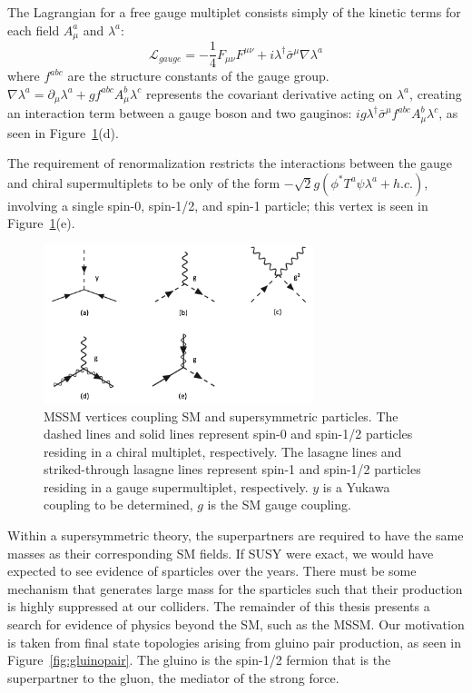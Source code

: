 The Lagrangian for a free gauge multiplet consists simply of the kinetic terms for each field $A_{\mu}^{a}$ and $\lambda^{a}$:
\begin{equation}
\mathcal{L}_{gauge} = -\frac{1}{4}F_{\mu\nu}F^{\mu\nu} + i \lambda^{\dagger}\bar{\sigma}^{\mu}\nabla\lambda^{a}
\end{equation}
where $f^{abc}$ are the structure constants of the gauge group. $\nabla\lambda^{a} = \partial_{\mu}\lambda^{a}+gf^{abc}A^{b}_{\mu}\lambda^{c}$ represents the covariant derivative acting on $\lambda^{a}$, creating an interaction term between a gauge boson and two gauginos: $i g \lambda^{\dagger}\bar{\sigma}^{\mu} f^{abc}A^{b}_{\mu}\lambda^{c}$, as seen in Figure~\ref{fig:mssmfeyn}(d).

The requirement of renormalization restricts the interactions between the gauge and chiral supermultiplets to be only of the form $-\sqrt{2}g(\phi^{*}T^{a}\psi\lambda^{a}+h.c.)$, involving a single spin-0, spin-1/2, and spin-1 particle; this vertex is seen in Figure~\ref{fig:mssmfeyn}(e).

\begin{figure}
\centering
\includegraphics[width=0.7\textwidth]{figs/mssmfeyn.png}
\caption[MSSM vertices coupling SM and supersymmetric particles.]{MSSM vertices coupling SM and supersymmetric particles. The dashed lines and solid lines represent spin-0 and spin-1/2 particles residing in a chiral multiplet, respectively. The lasagne lines and striked-through lasagne lines represent spin-1 and spin-1/2 particles residing in a gauge supermultiplet, respectively. $y$ is a Yukawa coupling to be determined, $g$ is the SM gauge coupling.}
\label{fig:mssmfeyn}
\end{figure}

Within a supersymmetric theory, the superpartners are required to have the same masses as their corresponding SM fields. If SUSY were exact, we would have expected to see evidence of sparticles over the years. There must be some mechanism that generates large mass for the sparticles such that their production is highly suppressed at our colliders. The remainder of this thesis presents a search for evidence of physics beyond the SM, such as the MSSM. Our motivation is taken from final state topologies arising from gluino pair production, as seen in Figure~\ref{fig:gluinopair}. The gluino is the spin-1/2 fermion that is the superpartner to the gluon, the mediator of the strong force.

